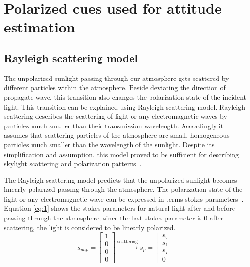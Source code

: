 \graphicspath{{./content/intro/figures/}}

\section{Polarized cues used for attitude estimation}
\label{sec:pcues}


\subsection{Rayleigh scattering model}
\label{subsec:rayleigh}
The unpolarized sunlight passing through our atmosphere gets scattered by
different particles within the atmosphere.  Beside deviating the direction of
propagate wave, this transition also changes the polarization state of the
incident light. This transition can be explained using Rayleigh scattering
model.  Rayleigh scattering describes the scattering of light or any
electromagnetic waves by particles much smaller than their transmission
wavelength. Accordingly it assumes that scattering particles of the atmosphere
are small, homogeneous particles much smaller than the wavelength of the
sunlight.  Despite its simplification and assumption, this model proved to be
sufficient for describing skylight scattering and polarization
patterns~\cite{pomozi2001clearsky, horvath2002ground}.

The Rayleigh scattering model predicts that the unpolarized sunlight becomes
linearly polarized passing through the atmosphere. The polarization state of
the light or any electromagnetic wave can be expressed in terms
stokes parameters~\cite{goldstein2017polarized}.  Equation
\ref{eq:1} shows the stokes parameters for natural light after and before
passing through the atmosphere, since the last stokes parameter is $0$ after
scattering, the light is considered to be linearly polarized.
\begin{equation}
  \label{eq:1}
  s_{unp} =
  \begin{bmatrix}
    1\\0\\0\\0
  \end{bmatrix}
  \xrightarrow[]{\text{scattering}}
  s_{p}=
  \begin{bmatrix}
   s_0 \\ s_1 \\ s_2 \\ 0
 \end{bmatrix}
\end{equation}

